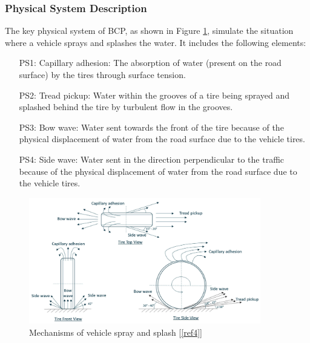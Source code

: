 \documentclass[12pt]{article}
\newcommand{\reref}[1]{\ref{#1}}
\begin{document}
\subsubsection{Physical System Description} \label{sec_phySystDescrip}


The key physical system of BCP, as shown in Figure \ref{4mechanism}, simulate the situation where a vehicle sprays and splashes the water. It includes the following elements:

\begin{itemize}

\item[PS1:] Capillary adhesion: The absorption of water (present on the road surface) by the tires through surface tension.

\item[PS2:] Tread pickup: Water within the grooves of a tire being sprayed and splashed behind the tire by turbulent flow in the grooves.

\item[PS3:] Bow wave: Water sent towards the front of the tire because of the physical displacement of water from the road surface due to the vehicle tires.

\item[PS4:] Side wave: Water sent in the direction perpendicular to the traffic because of the physical displacement of water from the road surface due to the vehicle tires.

\end{itemize}


\begin{figure}[h!]
\begin{center}
\includegraphics[width=0.9\textwidth]{phymodel}
\caption{\label{4mechanism} Mechanisms of vehicle spray and splash [\reref{ref4}]}

\end{center}
\end{figure}
\end{document}
